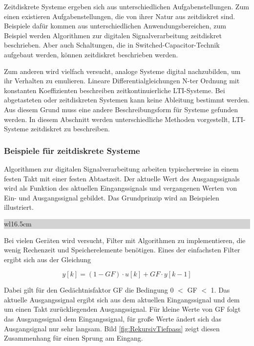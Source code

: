\noindent Zeitdiskrete Systeme ergeben sich aus unterschiedlichen Aufgabenstellungen. Zum einen existieren Aufgabenstellungen, die von ihrer Natur aus zeitdiskret sind. Beispiele daf\"{u}r kommen aus unterschiedlichen Anwendungsbereichen, zum Beispiel werden Algorithmen zur digitalen Signalverarbeitung zeitdiskret beschrieben. Aber auch Schaltungen, die in Switched-Capacitor-Technik aufgebaut werden, k\"{o}nnen zeitdiskret beschrieben werden. \medskip

\noindent Zum anderen wird vielfach versucht, analoge Systeme digital nachzubilden, um ihr Verhalten zu emulieren. Lineare Differentialgleichungen N-ter Ordnung mit konstanten Koeffizienten beschreiben zeitkontinuierliche LTI-Systeme. Bei abgetasteten oder zeitdiskreten Systemen kann keine Ableitung bestimmt werden. Aus diesem Grund muss eine andere Beschreibungsform f\"{u}r Systeme gefunden werden. In diesem Abschnitt werden unterschiedliche Methoden vorgestellt, LTI-Systeme zeitdiskret zu beschreiben.

\clearpage

\subsubsection{Beispiele f\"{u}r zeitdiskrete Systeme}

\noindent Algorithmen zur digitalen Signalverarbeitung arbeiten typischerweise in einem festen Takt mit einer festen Abtastzeit. Der aktuelle Wert des Ausgangssignals wird als Funktion des aktuellen Eingangssignals und vergangenen Werten von Ein- und Ausgangssignal gebildet. Das Grundprinzip wird an Beispielen illustriert.\bigskip

\noindent
\colorbox{lightgray}{%
%
\renewcommand\arraystretch{0.6}%
\begin{tabular}{ wl{16.5cm} }
{ }
\end{tabular}%
}\medskip

\noindent Bei vielen Ger\"{a}ten wird versucht, Filter mit Algorithmen zu implementieren, die wenig Rechenzeit und Speicherelemente ben\"{o}tigen. Eines der einfachsten Filter ergibt sich aus der Gleichung

\begin{equation}\label{eq:fourone}
y\left[k\right]=\left(1-GF\right)\cdot u\left[k\right]+GF\cdot y\left[k-1\right]    
\end{equation}

\noindent Dabei gilt f\"{u}r den Ged\"{a}chtnisfaktor GF die Bedingung 0 $\mathrm{<}$ GF $\mathrm{<}$ 1. Das aktuelle Ausgangssignal ergibt sich aus dem aktuellen Eingangssignal und dem um einen Takt zur\"{u}ckliegenden Ausgangssignal. F\"{u}r kleine Werte von GF folgt das Ausgangssignal dem Eingangssignal, f\"{u}r gro{\ss}e Werte \"{a}ndert sich das Ausgangsignal nur sehr langsam. Bild \ref{fig:RekursivTiefpass} zeigt diesen Zusammenhang f\"{u}r einen Sprung am Eingang.

